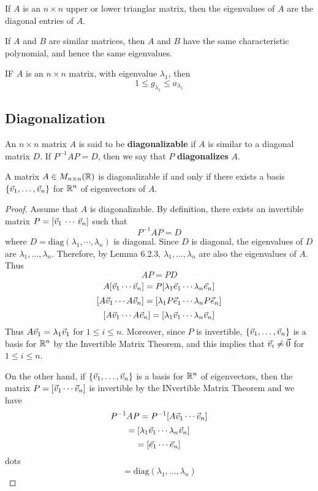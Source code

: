 \documentclass[english, 12pt]{article}
\begin{document}
\begin{thrm}
If $A$ is an $n \times n$ upper or lower trianglar matrix, then the eigenvalues of $A$ are the diagonal entries of $A$.
\end{thrm}

\begin{qte}
\begin{thrm}
If $A$ and $B$ are similar matrices, then $A$ and $B$ have the same characteristic polynomial, and hence the same eigenvalues.
\end{thrm}
\end{qte}

\begin{thrm}
IF $A$ is an $n \times n$ matrix, with eigenvalue $\lambda_1$, then
\[1 \leq g_{\lambda_1} \leq a_{\lambda_1}\]
\end{thrm}

\subsection{Diagonalization}

\begin{defn}
An $n \times n$ matrix $A$ is said to be \textbf{diagonalizable} if $A$ is similar to a diagonal matrix $D$. If $P^{-1}AP = D$, then we say that $P$ \textbf{diagonalizes} $A$.
\end{defn}

\begin{thrm}
A matrix $A \in M_{n \times n}({\mathbb{R}})$ is diagonalizable if and only if there exists a basis $\{\vec{v}_1,\dots,\vec{v}_n\}$ for ${\mathbb{R}}^n$ of eigenvectors of $A$.
\begin{proof}
Assume that $A$ is diagonalizable. By definition, there exists an invertible matrix $P = \lbrack \vec{v}_1\,\cdots\,\vec{v}_n \rbrack$ such that
\[P^{-1}AP = D\]
where $D = \text{diag}(\lambda_1,\cdots,\lambda_n)$ is diagonal. Since $D$ is diagonal, the eigenvalues of $D$ are $\lambda_1,\dots,\lambda_n$. Therefore, by Lemma 6.2.3, $\lambda_1,\dots,\lambda_n$ are also the eigenvalues of $A$. \n
Thus
\[AP = PD\]
\[A \lbrack \vec{v}_1 \cdots \vec{v}_n \rbrack = P \lbrack \lambda_1 \vec{e}_1 \cdots \lambda_n \vec{e}_n \rbrack\]
\[\lbrack A\vec{v}_1 \cdots A\vec{v}_n \rbrack = \lbrack \lambda_1 P\vec{e}_1 \cdots \lambda_n P\vec{e}_n \rbrack\]
\[\lbrack A\vec{v}_1 \cdots A\vec{v}_n \rbrack = \lbrack \lambda_1 \vec{v}_1 \cdots \lambda_n \vec{v}_n \rbrack\]
Thus $A\vec{v}_1 = \lambda_1 \vec{v}_1$ for $1 \leq i \leq n$. Moreover, since $P$ is invertible, $\{\vec{v}_1,\dots,\vec{v}_n\}$ is a basis for ${\mathbb{R}}^n$ by the Invertible Matrix Theorem, and this implies that $\vec{v}_i \neq \vec{0}$ for $1 \leq i \leq n$.\n

On the other hand, if $\{\vec{v}_1,\dots,\vec{v}_n\}$ is a basis for ${\mathbb{R}}^n$ of eigenvectors, then the matrix $P = \lbrack \vec{v}_1 \cdots \vec{v}_n \rbrack$ is invertible by the INvertible Matrix Theorem and we have
\[P^{-1} AP = P^{-1} \lbrack A \vec{v}_1 \cdots \vec{v}_n \rbrack\]
\[=\lbrack \lambda_1 \vec{v}_1 \cdots \lambda_n \vec{v}_n \rbrack\]
\[=\lbrack \vec{e}_1 \cdots \vec{e}_n \rbrack\]
dots
\[=\text{diag}(\lambda_1,\dots,\lambda_n)\]
\end{proof}
\end{thrm}
\end{document}
